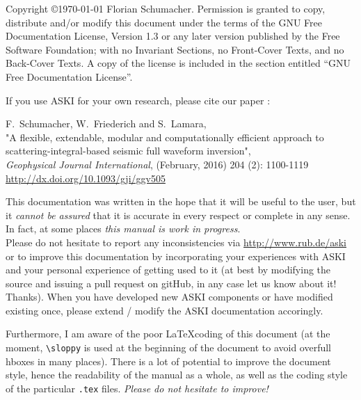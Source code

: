 \documentclass[12pt,a4paper]{article}
\newcommand{\lcode}[1]{\nolinkurl{#1}}
\newcommand{\ASKI}{ {\ttfamily ASKI} }
\begin{document}
\sloppy
%
\setlength{\parindent}{0cm}
\addtolength{\parskip}{0.5em}
%
%

%
%
Copyright \copyright {\myyear \today} Florian Schumacher.
Permission is granted to copy, distribute and/or modify this document
under the terms of the GNU Free Documentation License, Version 1.3
or any later version published by the Free Software Foundation;
with no Invariant Sections, no Front-Cover Texts, and no Back-Cover Texts.
A copy of the license is included in the section entitled ``GNU
Free Documentation License''.

\vspace{1cm}

If you use \ASKI{} for your own research, please cite our paper \cite{Schumacher16}:

F.\ Schumacher, W.\ Friederich and S.\ Lamara, \\
"A flexible, extendable, modular and 
computationally efficient approach to scattering-integral-based seismic full waveform 
inversion", \\
\emph{Geophysical Journal International}, (February, 2016) 204 (2): 1100-1119\\
\url{http://dx.doi.org/10.1093/gji/ggv505}

\vspace{1em}

This documentation was written in the hope that it will be useful to the user,
but it \emph{cannot be assured} that it is accurate in every respect or complete in any sense.
In fact, at some places \emph{this manual is work in progress}.\\
Please do not hesitate to report any inconsistencies via \url{http://www.rub.de/aski} or
to improve this documentation by incorporating your experiences with \ASKI{} 
and your personal experience of getting used to it (at best by modifying the source and issuing a pull request
on gitHub, in any case let us know about it! Thanks).
When you have developed new \ASKI{} components or 
have modified existing once, please extend / modify the \ASKI{} documentation accoringly.

Furthermore, I am aware of the poor \LaTeX coding of this document (at the moment, \verb+\sloppy+ is used
at the beginning of the document to avoid overfull hboxes in many places). There is a lot of potential
to improve the document 
style, hence the readability of the manual as a whole, as well as the coding style of the 
particular \lcode{.tex} files. \emph{Please do not hesitate to improve!}
\end{document}
